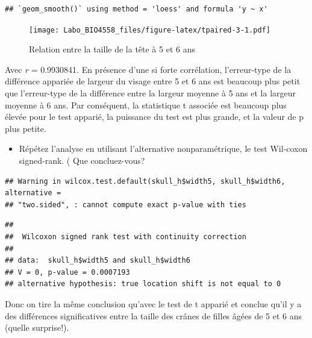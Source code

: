 \documentclass[12pt,]{book}
\newenvironment{Shaded}{\begin{snugshade}}{\end{snugshade}}
\newcommand{\DataTypeTok}[1]{\textcolor[rgb]{0.27,0.27,0.27}{#1}}
\newcommand{\KeywordTok}[1]{\textcolor[rgb]{0.27,0.27,0.27}{\textbf{#1}}}
\newcommand{\NormalTok}[1]{#1}
\newcommand{\OperatorTok}[1]{\textcolor[rgb]{0.43,0.43,0.43}{\textbf{#1}}}
\newcommand{\OtherTok}[1]{\textcolor[rgb]{0.37,0.37,0.37}{#1}}
\newcommand{\StringTok}[1]{\textcolor[rgb]{0.5,0.5,0.5}{#1}}
\providecommand{\tightlist}{%
  \setlength{\itemsep}{0pt}\setlength{\parskip}{0pt}}
\begin{document}
\begin{verbatim}
## `geom_smooth()` using method = 'loess' and formula 'y ~ x'
\end{verbatim}

\begin{figure}
\centering
\texttt{[image: Labo\_BIO4558\_files/figure-latex/tpaired-3-1.pdf]}
\caption{\label{fig:tpaired-3}Relation entre la taille de la tête à 5 et 6 ans}
\end{figure}

Avec \emph{r} = 0.9930841. En présence d'une si forte corrélation, l'erreur-type de la différence appariée de largeur du visage entre 5 et 6 ans est beaucoup plus petit que l'erreur-type de la différence entre la largeur moyenne à 5 ans et la largeur moyenne à 6 ans. Par conséquent, la statistique t associée est beaucoup plus élevée pour le test apparié, la puissance du test est plus grande, et la valeur de p plus petite.

\begin{itemize}
\tightlist
\item
  Répétez l'analyse en utilisant l'alternative nonparamétrique, le test Wil-coxon signed-rank. ( Que concluez-vous?
\end{itemize}

\begin{Shaded}
\end{Shaded}

\begin{verbatim}
## Warning in wilcox.test.default(skull_h$width5, skull_h$width6, alternative =
## "two.sided", : cannot compute exact p-value with ties
\end{verbatim}

\begin{verbatim}
## 
## 	Wilcoxon signed rank test with continuity correction
## 
## data:  skull_h$width5 and skull_h$width6
## V = 0, p-value = 0.0007193
## alternative hypothesis: true location shift is not equal to 0
\end{verbatim}

Donc on tire la même conclusion qu'avec le test de t apparié et conclue qu'il y a des différences significatives entre la taille des crânes de filles âgées de 5 et 6 ans (quelle surprise!).
\end{document}
